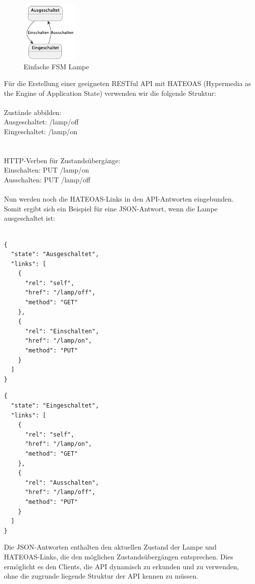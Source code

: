 \documentclass[../vs-script-first-v01.tex]{subfiles}
\begin{document}
\begin{figure}[!ht]
  \centering
  \includegraphics[width=0.25\textwidth]{fig/uml/lampe.png}
  \caption{Einfache FSM Lampe}
  \label{fig:lampe}
\end{figure}
Für die Erstellung einer geeigneten RESTful API mit HATEOAS (Hypermedia as the Engine of Application State) verwenden wir die folgende Struktur:
\\\\
Zustände abbilden:
\\
Ausgeschaltet: /lamp/off\\
Eingeschaltet: /lamp/on\\
\\\\
HTTP-Verben für Zustandsübergänge:
\\
Einschalten: PUT /lamp/on\\
Ausschalten: PUT /lamp/off
\\\\
Nun werden noch die HATEOAS-Links in den API-Antworten eingebunden. Somit ergibt sich ein Beispiel für eine JSON-Antwort, wenn die Lampe ausgeschaltet ist:\\\\
\noindent\begin{minipage}{\textwidth}
\begin{lstlisting}[caption={Fallbeispiel REST - aus},captionpos=b,label={lst:rest_on}]
{
  "state": "Ausgeschaltet",
  "links": [
    {
      "rel": "self",
      "href": "/lamp/off",
      "method": "GET"
    },
    {
      "rel": "Einschalten",
      "href": "/lamp/on",
      "method": "PUT"
    }
  ]
}
\end{lstlisting}
\end{minipage}

\noindent\begin{minipage}{\textwidth}
\begin{lstlisting}[caption={Fallbeispiel REST - an},captionpos=b,label={lst:rest_an}]
{
  "state": "Eingeschaltet",
  "links": [
    {
      "rel": "self",
      "href": "/lamp/on",
      "method": "GET"
    },
    {
      "rel": "Ausschalten",
      "href": "/lamp/off",
      "method": "PUT"
    }
  ]
}
\end{lstlisting}
\end{minipage}
Die JSON-Antworten enthalten den aktuellen Zustand der Lampe und HATEOAS-Links, die den möglichen Zustandsübergängen entsprechen. Dies ermöglicht es den Clients, die API dynamisch zu erkunden und zu verwenden, ohne die zugrunde liegende Struktur der API kennen zu müssen.\\\\
\end{document}
